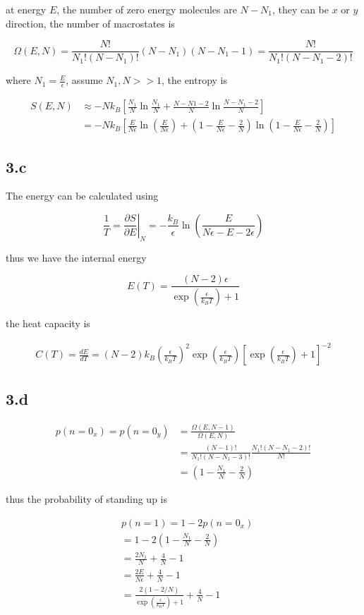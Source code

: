 \documentclass{article}
\begin{document}
at energy $E$, the number of zero energy molecules are $N - N_1$, they can be $x$ or $y$ direction,
the number of macrostates is

$$
\Omega(E, N) = \frac{N!}{N_1!(N-N_1)!} (N-N_1)(N-N_1-1) = \frac{N!}{N_1!(N-N_1-2)!}
$$

where $N_1 = \frac{E}{\epsilon}$, assume $N_1, N >> 1$, the entropy is

$$
\begin{aligned}
    S(E, N) &\approx -Nk_B [\frac{N_1}{N}\ln\frac{N_1}{N} + \frac{N-N1-2}{N}\ln\frac{N-N_1-2}{N}]\\
    &= -Nk_B[\frac{E}{N\epsilon}\ln(\frac{E}{N\epsilon}) + (1 - \frac{E}{N\epsilon}- \frac{2}{N})\ln(1 - \frac{E}{N\epsilon}- \frac{2}{N})]
\end{aligned}
$$

\subsection*{3.c}
The energy can be calculated using

$$
\frac{1}{T} = \left.\frac{\partial S}{\partial E} \right|_N = -\frac{k_B}{\epsilon} \ln(\frac{E}{N\epsilon - E - 2\epsilon})
$$

thus we have the internal energy

$$
E(T) = \frac{(N-2)\epsilon}{\exp(\frac{\epsilon}{k_B T}) + 1}
$$

the heat capacity is

$$
\begin{aligned}
    C(T) = \frac{dE}{dT} = (N-2)k_B (\frac{\epsilon}{k_B T})^2 \exp(\frac{\epsilon}{k_B T})[\exp(\frac{\epsilon}{k_B T}) + 1]^{-2}
\end{aligned}
$$


\subsection*{3.d}

$$
\begin{aligned}
    p(n=0_x) = p(n=0_y) &= \frac{\Omega(E, N-1)}{\Omega(E, N)}\\
    &= \frac{(N-1)!}{N_1!(N-N_1-3)!} \frac{N_1!(N-N_1-2)!}{N!}\\
    &= (1-\frac{N_1}{N}-\frac{2}{N})
\end{aligned}
$$

thus the probability of standing up is

$$
\begin{aligned}
    & p(n=1) = 1 - 2p(n=0_x) \\
    &= 1 - 2(1 - \frac{N_1}{N} - \frac{2}{N})\\
    &= \frac{2N_1}{N} + \frac{4}{N} - 1\\
    &= \frac{2E}{N\epsilon} + \frac{4}{N} - 1\\
    &= \frac{2(1-2/N)}{\exp(\frac{\epsilon}{k_BT}) + 1} + \frac{4}{N} - 1
\end{aligned}
$$
\end{document}
